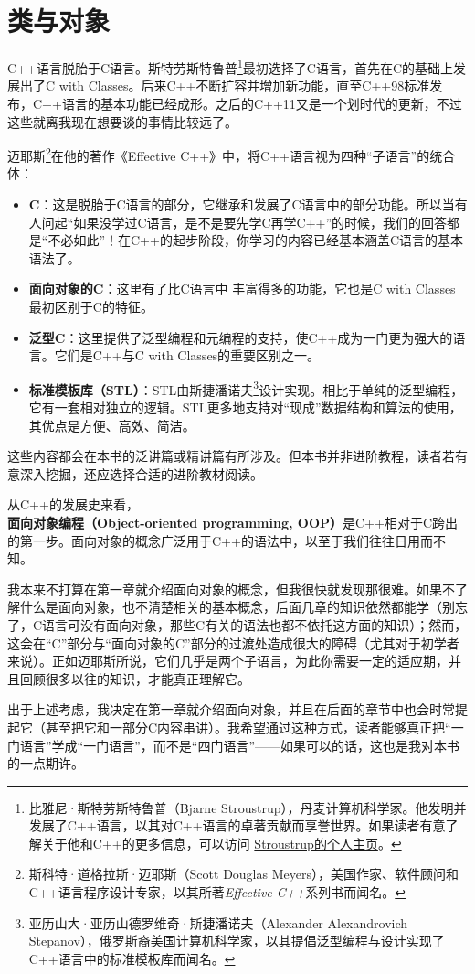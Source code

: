\section{类与对象}
C++语言脱胎于C语言。斯特劳斯特鲁普\footnote{比雅尼·斯特劳斯特鲁普（Bjarne Stroustrup），丹麦计算机科学家。他发明并发展了C++语言，以其对C++语言的卓著贡献而享誉世界。如果读者有意了解关于他和C++的更多信息，可以访问 \href{https://www.stroustrup.com/}{Stroustrup的个人主页}。}最初选择了C语言，首先在C的基础上发展出了C with Classes。后来C++不断扩容并增加新功能，直至C++98标准发布，C++语言的基本功能已经成形。之后的C++11又是一个划时代的更新，不过这些就离我现在想要谈的事情比较远了。\par
迈耶斯\footnote{斯科特·道格拉斯·迈耶斯（Scott Douglas Meyers），美国作家、软件顾问和C++语言程序设计专家，以其所著\textit{Effective C++}系列书而闻名。}在他的著作《Effective C++》中，将C++语言视为四种``子语言''的统合体：
\begin{itemize}
    \item \textbf{C}：这是脱胎于C语言的部分，它继承和发展了C语言中的部分功能。所以当有人问起``如果没学过C语言，是不是要先学C再学C++''的时候，我们的回答都是``不必如此''！在C++的起步阶段，你学习的内容已经基本涵盖C语言的基本语法了。
    \item \textbf{面向对象的C}：这里有了比C语言中 \lstinline@struct@ 丰富得多的功能，它也是C with Classes最初区别于C的特征。
    \item \textbf{泛型C}：这里提供了泛型编程和元编程的支持，使C++成为一门更为强大的语言。它们是C++与C with Classes的重要区别之一。
    \item \textbf{标准模板库（STL）}：STL由斯捷潘诺夫\footnote{亚历山大·亚历山德罗维奇·斯捷潘诺夫（Alexander Alexandrovich Stepanov），俄罗斯裔美国计算机科学家，以其提倡泛型编程与设计实现了C++语言中的标准模板库而闻名。}设计实现。相比于单纯的泛型编程，它有一套相对独立的逻辑。STL更多地支持对``现成''数据结构和算法的使用，其优点是方便、高效、简洁。
\end{itemize}
这些内容都会在本书的泛讲篇或精讲篇有所涉及。但本书并非进阶教程，读者若有意深入挖掘，还应选择合适的进阶教材阅读。\par
从C++的发展史来看，\textbf{面向对象编程（Object-oriented programming, OOP）}是C++相对于C跨出的第一步。面向对象的概念广泛用于C++的语法中，以至于我们往往日用而不知。\par
我本来不打算在第一章就介绍面向对象的概念，但我很快就发现那很难。如果不了解什么是面向对象，也不清楚相关的基本概念，后面几章的知识依然都能学（别忘了，C语言可没有面向对象，那些C有关的语法也都不依托这方面的知识）；然而，这会在``C''部分与``面向对象的C''部分的过渡处造成很大的障碍（尤其对于初学者来说）。正如迈耶斯所说，它们几乎是两个子语言，为此你需要一定的适应期，并且回顾很多以往的知识，才能真正理解它。\par
出于上述考虑，我决定在第一章就介绍面向对象，并且在后面的章节中也会时常提起它（甚至把它和一部分C内容串讲）。我希望通过这种方式，读者能够真正把``一门语言''学成``一门语言''，而不是``四门语言''——如果可以的话，这也是我对本书的一点期许。\par
